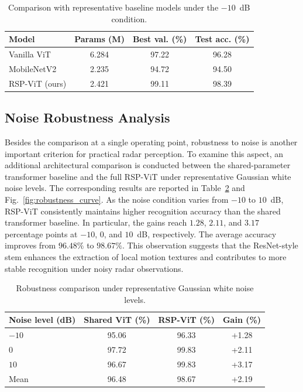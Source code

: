 \documentclass{svproc}
\begin{document}
\begin{table}[t]
\caption{Comparison with representative baseline models under the $-10$~dB condition.}
\label{tab:main_compare}
\centering
\small
\begin{tabular}{lccc}
\hline
Model & Params (M) & Best val. (\%) & Test acc. (\%) \\
\hline
Vanilla ViT & 6.284 & 97.22 & 96.28 \\
MobileNetV2 & 2.235 & 94.72 & 94.50 \\
RSP-ViT (ours) & 2.421 & 99.11 & 98.39 \\
\hline
\end{tabular}
\end{table}

\subsection{Noise Robustness Analysis}

Besides the comparison at a single operating point, robustness to noise is another important criterion for practical radar perception. To examine this aspect, an additional architectural comparison is conducted between the shared-parameter transformer baseline and the full RSP-ViT under representative Gaussian white noise levels. The corresponding results are reported in Table~\ref{tab:robustness_compare} and Fig.~\ref{fig:robustness_curve}. As the noise condition varies from $-10$ to $10$~dB, RSP-ViT consistently maintains higher recognition accuracy than the shared transformer baseline. In particular, the gains reach $1.28$, $2.11$, and $3.17$ percentage points at $-10$, $0$, and $10$~dB, respectively. The average accuracy improves from $96.48\%$ to $98.67\%$. This observation suggests that the ResNet-style stem enhances the extraction of local motion textures and contributes to more stable recognition under noisy radar observations.

\begin{table}[t]
\caption{Robustness comparison under representative Gaussian white noise levels.}
\label{tab:robustness_compare}
\centering
\small
\begin{tabular}{lccc}
\hline
Noise level (dB) & Shared ViT (\%) & RSP-ViT (\%) & Gain (\%) \\
\hline
$-10$ & 95.06 & 96.33 & +1.28 \\
$0$   & 97.72 & 99.83 & +2.11 \\
$10$  & 96.67 & 99.83 & +3.17 \\
Mean  & 96.48 & 98.67 & +2.19 \\
\hline
\end{tabular}
\end{table}
\end{document}
